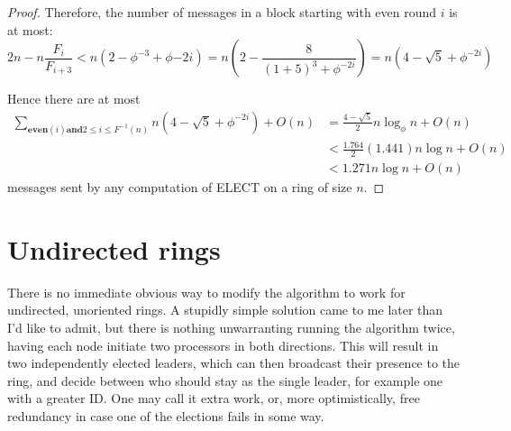 \documentclass{article}
\begin{document}
\begin{proof}
    Therefore, the number of messages in a block starting with even round $i$ is at most:
    \[
        2n - n\frac{F_i}{F_{i+3}} < n(2 - \phi^{-3} + \phi{-2i}) = n \left( 2-\frac{8}{(1+5)^3 + \phi^{-2i}} \right) = n(4-\sqrt{5}+\phi^{-2i})
    \]

    Hence there are at most
    \[
    \begin{aligned}
        \sum_{\textbf{even}(i) \textbf{and} 2\leq i \leq F^{-1}(n)} 
            n(4-\sqrt{5}+\phi^{-2i}) + O(n)
        & = \frac{4 - \sqrt{5}}{2}n\log_{\phi}n + O(n) \\
        & < \frac{1.764}{2}(1.441)n\log n + O(n) \\
        & < 1.271n\log n + O(n)
    \end{aligned}
    \]
    messages sent by any computation of ELECT on a ring of size $n$.
\end{proof}

\section{Undirected rings}

\textnormal{There is no immediate obvious way to modify the algorithm to work for undirected, unoriented rings. A stupidly simple solution came to me later than I'd like to admit, but there is nothing unwarranting running the algorithm twice, having each node initiate two processors in both directions. This will result in two independently elected leaders, which can then broadcast their presence to the ring, and decide between who should stay as the single leader, for example one with a greater ID. One may call it extra work, or, more optimistically, free redundancy in case one of the elections fails in some way.}
\end{document}
